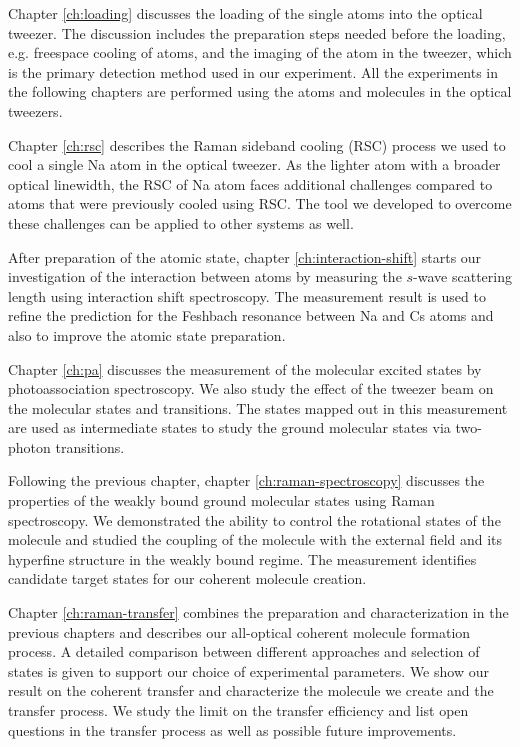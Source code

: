 Chapter \ref{ch:loading} discusses the loading of the single atoms into the optical tweezer.
The discussion includes the preparation steps needed before the loading,
e.g. freespace cooling of atoms,
and the imaging of the atom in the tweezer,
which is the primary detection method used in our experiment.
All the experiments in the following chapters are performed using
the atoms and molecules in the optical tweezers.

Chapter \ref{ch:rsc} describes the Raman sideband cooling (RSC) process
we used to cool a single Na atom in the optical tweezer.
As the lighter atom with a broader optical linewidth,
the RSC of Na atom faces additional challenges compared to atoms
that were previously cooled using RSC.
The tool we developed to overcome these challenges can be applied to other systems as well.

After preparation of the atomic state,
chapter \ref{ch:interaction-shift} starts our investigation of the interaction between atoms
by measuring the $s$-wave scattering length using interaction shift spectroscopy.
The measurement result is used to refine the prediction for the Feshbach resonance
between Na and Cs atoms and also to improve the atomic state preparation.

Chapter \ref{ch:pa} discusses the measurement of the molecular excited states
by photoassociation spectroscopy.
We also study the effect of the tweezer beam on the molecular states and transitions.
The states mapped out in this measurement are used as intermediate states
to study the ground molecular states via two-photon transitions.

Following the previous chapter, chapter \ref{ch:raman-spectroscopy} discusses
the properties of the weakly bound ground molecular states using Raman spectroscopy.
We demonstrated the ability to control the rotational states of the molecule
and studied the coupling of the molecule with the external field
and its hyperfine structure in the weakly bound regime.
The measurement identifies candidate target states for our coherent molecule creation.

Chapter \ref{ch:raman-transfer} combines the preparation and characterization
in the previous chapters and describes our all-optical coherent molecule formation process.
A detailed comparison between different approaches and selection of states is given
to support our choice of experimental parameters.
We show our result on the coherent transfer and characterize
the molecule we create and the transfer process.
We study the limit on the transfer efficiency
and list open questions in the transfer process
as well as possible future improvements.
